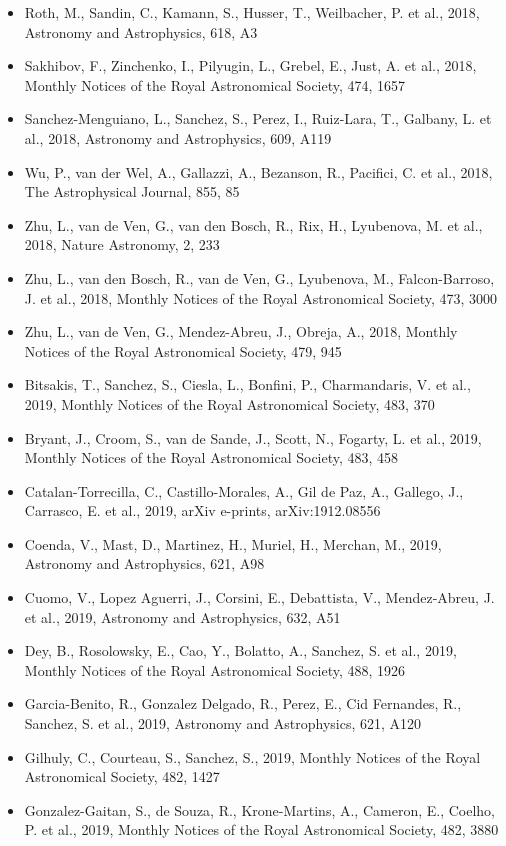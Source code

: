 \documentclass{letter}
\begin{document}
\begin{enumerate}
\begin{itemize}
\item Roth, M., Sandin, C., Kamann, S., Husser, T., Weilbacher, P. et al., 2018, Astronomy and Astrophysics, 618, A3
\item Sakhibov, F., Zinchenko, I., Pilyugin, L., Grebel, E., Just, A. et al., 2018, Monthly Notices of the Royal Astronomical Society, 474, 1657
\item Sanchez-Menguiano, L., Sanchez, S., Perez, I., Ruiz-Lara, T., Galbany, L. et al., 2018, Astronomy and Astrophysics, 609, A119
\item Wu, P., van der Wel, A., Gallazzi, A., Bezanson, R., Pacifici, C. et al., 2018, The Astrophysical Journal, 855, 85
\item Zhu, L., van de Ven, G., van den Bosch, R., Rix, H., Lyubenova, M. et al., 2018, Nature Astronomy, 2, 233
\item Zhu, L., van den Bosch, R., van de Ven, G., Lyubenova, M., Falcon-Barroso, J. et al., 2018, Monthly Notices of the Royal Astronomical Society, 473, 3000
\item Zhu, L., van de Ven, G., Mendez-Abreu, J., Obreja, A., 2018, Monthly Notices of the Royal Astronomical Society, 479, 945
\item Bitsakis, T., Sanchez, S., Ciesla, L., Bonfini, P., Charmandaris, V. et al., 2019, Monthly Notices of the Royal Astronomical Society, 483, 370
\item Bryant, J., Croom, S., van de Sande, J., Scott, N., Fogarty, L. et al., 2019, Monthly Notices of the Royal Astronomical Society, 483, 458
\item Catalan-Torrecilla, C., Castillo-Morales, A., Gil de Paz, A., Gallego, J., Carrasco, E. et al., 2019, arXiv e-prints, arXiv:1912.08556
\item Coenda, V., Mast, D., Martinez, H., Muriel, H., Merchan, M., 2019, Astronomy and Astrophysics, 621, A98
\item Cuomo, V., Lopez Aguerri, J., Corsini, E., Debattista, V., Mendez-Abreu, J. et al., 2019, Astronomy and Astrophysics, 632, A51
\item Dey, B., Rosolowsky, E., Cao, Y., Bolatto, A., Sanchez, S. et al., 2019, Monthly Notices of the Royal Astronomical Society, 488, 1926
\item Garcia-Benito, R., Gonzalez Delgado, R., Perez, E., Cid Fernandes, R., Sanchez, S. et al., 2019, Astronomy and Astrophysics, 621, A120
\item Gilhuly, C., Courteau, S., Sanchez, S., 2019, Monthly Notices of the Royal Astronomical Society, 482, 1427
\item Gonzalez-Gaitan, S., de Souza, R., Krone-Martins, A., Cameron, E., Coelho, P. et al., 2019, Monthly Notices of the Royal Astronomical Society, 482, 3880

\end{itemize}
\end{enumerate}
\end{document}
